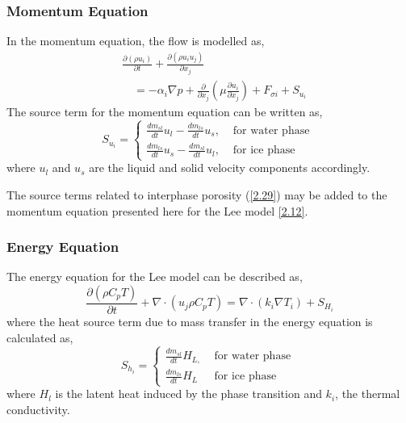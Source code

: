 \subsubsection{Momentum Equation}

\setlength{\parindent}{0.5cm} In the momentum equation, the flow is modelled as,
\begin{equation}
	\label{2.12}
	\begin{aligned}
	&\frac{\partial\left(\rho {u}_{i}\right)}{\partial t}+\frac{\partial\left(\rho {u}_{i} {u}_{j}\right)}{\partial x_{j}} \\
	&\quad=-\alpha_{i} \nabla p+\frac{\partial}{\partial x_{j}}\left(\mu \frac{\partial {u}_{i}}{\partial x_{j}}\right)+F_{\sigma i}+S_{u_{i}}
	\end{aligned}
\end{equation}
The source term for the momentum equation can be written as,
\begin{equation}
	\label{2.13}
	S_{u_{i}}=\left\{\begin{array}{cr}
	\frac{d m_{s l}}{d t} \textbf{$u_{l}$}-\frac{d m_{l s}}{d t} \textbf{$u_{s},$} & \text { for water phase } \\
	\frac{d m_{l s}}{d t} \textbf{$u_{s}$}-\frac{d m_{s l}}{d t} \textbf{$u_{l}$}, & \text { for ice phase }
	\end{array}\right.
\end{equation}
where \textbf{$u_{l}$} and \textbf{$u_{s}$} are the liquid and solid velocity components accordingly. 

\noindent The source terms related to interphase porosity (\ref{2.29}) may be added to the momentum equation presented here for the Lee model \ref{2.12}.

\subsubsection{Energy Equation}

\setlength{\parindent}{0.5cm} The energy equation for the Lee model can be described as,
\begin{equation}
	\label{2.14}
	\frac{\partial (\rho C_{p} T)}{\partial t}+\nabla \cdot\left(u_{j}\rho C_{p} T\right)=\nabla \cdot\left(k_{i} \nabla T_{i}\right)+S_{H_{i}}
\end{equation}
where the heat source term due to mass transfer in the energy equation is calculated as,
\begin{equation}
	\label{2.15}
	S_{h_{i}}=\left\{\begin{array}{lr}
	\frac{d m_{s l}}{d t} H_{L,} & \text { for water phase } \\
	\frac{d m_{l s}}{d t} H_{L} & \text { for ice phase }
	\end{array}\right.
\end{equation}
where \textit{$H_l$} is the latent heat induced by the phase transition and \textit{$k_i$}, the thermal conductivity.

